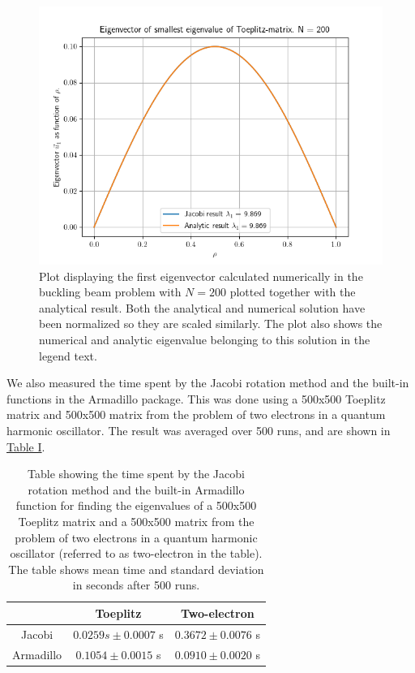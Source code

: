 \documentclass[reprint,english,notitlepage]{revtex4-1}  %
\begin{document}
\begin{figure}[h!] \label{fig:IV:a:1}
\includegraphics[scale=0.6]{toeplitz.png}
\caption{Plot displaying the first eigenvector calculated numerically in the buckling beam problem with $N=200$ plotted together with the analytical result. Both the analytical and numerical solution have been normalized so they are scaled similarly. The plot also shows the numerical and analytic eigenvalue belonging to this solution in the legend text.}
\end{figure}

We also measured the time spent by the Jacobi rotation method and the built-in functions in the Armadillo package. This was done using a 500x500 Toeplitz matrix and 500x500 matrix from the problem of two electrons in a quantum harmonic oscillator. The result was averaged over 500 runs, and are shown in \hyperref[table:IV:a:1]{Table I}.

\begin{table}[h!] \label{table:IV:a:1}
\caption{Table showing the time spent by the Jacobi rotation method and the built-in Armadillo function for finding the eigenvalues of a 500x500 Toeplitz matrix and a 500x500 matrix from the problem of two electrons in a quantum harmonic oscillator (referred to as two-electron in the table). The table shows mean time and standard deviation in seconds after 500 runs.}
\begin{tabular}{|c|c|c|}
\hline
 & Toeplitz & Two-electron \\
\hline
Jacobi & $0.0259 s \pm 0.0007$ s & $0.3672 \pm 0.0076$ s \\
Armadillo & $0.1054 \pm 0.0015$ s & $0.0910 \pm 0.0020$ s \\
\hline
\end{tabular}
\end{table}
\end{document}
